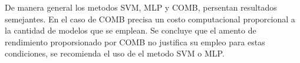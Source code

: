 \documentclass[12pt]{article}
\begin{document}
De manera general los metodos SVM, MLP y COMB, persentan resultados semejantes. En el caso de COMB precisa un costo computacional proporcional a la cantidad de modelos que se emplean. Se concluye que el amento de rendimiento proporsionado por COMB no justifica su empleo para estas condiciones, se recomienda el uso de el metodo SVM o MLP. 




%
%
%
%
%
%
\end{document}
